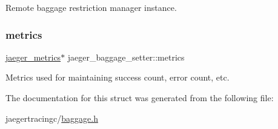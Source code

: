 Remote baggage restriction manager instance. 

\mbox{\label{structjaeger__baggage__setter_a0ed0b61f9d103eda5775cbcfc200c802}} 
\subsubsection{\texorpdfstring{metrics}{metrics}}
{\footnotesize\ttfamily \mbox{\hyperlink{structjaeger__metrics}{jaeger\+\_\+metrics}}$\ast$ jaeger\+\_\+baggage\+\_\+setter\+::metrics}



Metrics used for maintaining success count, error count, etc. 



The documentation for this struct was generated from the following file\+:\begin{DoxyCompactItemize}
\item 
jaegertracingc/\mbox{\hyperlink{baggage_8h}{baggage.\+h}}\end{DoxyCompactItemize}
